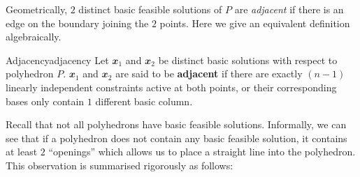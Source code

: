\documentclass[math, code]{amznotes}
\theoremstyle{remark}
\begin{document}
Geometrically, $2$ distinct basic feasible solutions of $P$ are \textit{adjacent} if there is an edge on the boundary joining the $2$ points. Here we give an equivalent definition algebraically.
\begin{dfnbox}{Adjacency}{adjacency}
    Let $\mathbfit{x}_1$ and $\mathbfit{x}_2$ be distinct basic solutions with respect to polyhedron $P$. $\mathbfit{x}_1$ and $\mathbfit{x}_2$ are said to be {\color{red} \textbf{adjacent}} if there are exactly $(n - 1)$ linearly independent constraints active at both points, or their corresponding bases only contain $1$ different basic column.
\end{dfnbox}
Recall that not all polyhedrons have basic feasible solutions. Informally, we can see that if a polyhedron does not contain any basic feasible solution, it contains at least $2$ ``openings'' which allows us to place a straight line into the polyhedron. This observation is summarised rigorously as follows:
\end{document}
